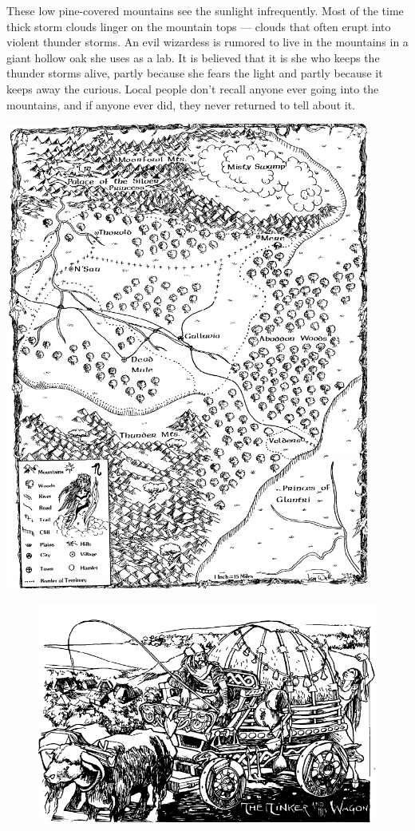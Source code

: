 \documentclass[palace_of_the_silver_princess]{subfiles}
\begin{document}
These low pine-covered mountains see the sunlight infrequently. Most of
the time thick storm clouds linger on the mountain tops — clouds that
often erupt into violent thunder storms. An evil wizardess is rumored to
live in the mountains in a giant hollow oak she uses as a lab. It is
believed that it is she who keeps the thunder storms alive, partly
because she fears the light and partly because it keeps away the
curious. Local people don’t recall anyone ever going into the mountains,
and if anyone ever did, they never returned to tell about it.

\clearpage
\begin{center}
	\includegraphics[width=0.9\textwidth]{img/overland_map.png}
\end{center}
\clearpage

\newpage
\begin{figure}[!ht]
	\includegraphics[width=\textwidth]{img/wagon.png}
\end{figure}
\end{document}
